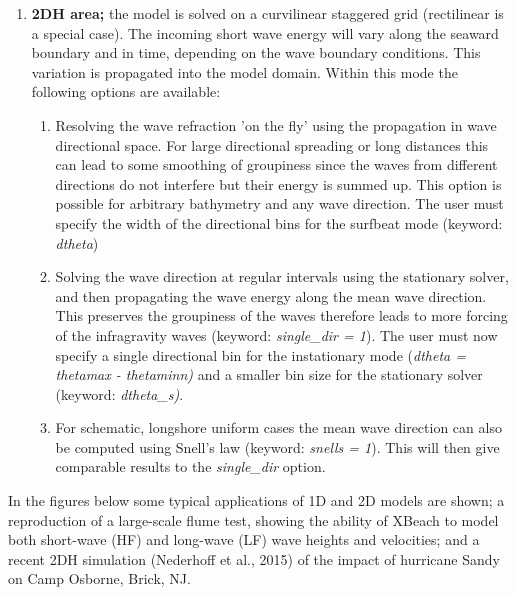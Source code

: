 \documentclass{article}
\begin{document}
\noindent 

\begin{enumerate}
\item  \textbf{2DH area; }the model is solved on a curvilinear staggered grid (rectilinear is a special case). The incoming short wave energy will vary along the seaward boundary and in time, depending on the wave boundary conditions. This variation is propagated into the model domain. Within this mode the following options are available:\textbf{}

\begin{enumerate}
\item \textbf{ }Resolving the wave refraction 'on the fly' using the propagation in wave directional space. For large directional spreading or long distances this can lead to some smoothing of groupiness since the waves from different directions do not interfere but their energy is summed up. This option is possible for arbitrary bathymetry and any wave direction. The user must specify the width of the directional bins for the surfbeat mode (keyword: \textit{dtheta})\textbf{}

\item \textbf{ }Solving the wave direction at regular intervals using the stationary solver, and then propagating the wave energy along the mean wave direction. This preserves the groupiness of the waves therefore leads to more forcing of the infragravity waves (keyword: \textit{single\_dir = 1}). The user must now specify a single directional bin for the instationary mode (\textit{dtheta = thetamax - thetaminn) }and a smaller bin size for the stationary solver (keyword: \textit{dtheta\_s)}.\textbf{}

\item \textbf{ }For schematic, longshore uniform cases the mean wave direction can also be computed using Snell's law (keyword: \textit{snells = 1}). This will then give comparable results to the \textit{single\_dir} option.\textbf{}
\end{enumerate}
\end{enumerate}

\noindent 

\noindent In the figures below some typical applications of 1D and 2D models are shown; a reproduction of a large-scale flume test, showing the ability of XBeach to model both short-wave (HF) and long-wave (LF) wave heights and velocities; and a recent 2DH simulation (Nederhoff et al., 2015) of the impact of hurricane Sandy on Camp Osborne, Brick, NJ.
\end{document}
